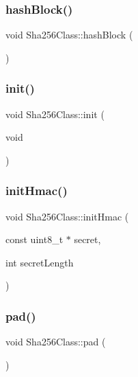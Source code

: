 \subsubsection{\texorpdfstring{hash\+Block()}{hashBlock()}}
{\footnotesize\ttfamily void Sha256\+Class\+::hash\+Block (\begin{DoxyParamCaption}{ }\end{DoxyParamCaption})\hspace{0.3cm}{\ttfamily [private]}}

\mbox{\label{classSha256Class_ac1025d69c51fcd1b882ee41114e58339}} 
\subsubsection{\texorpdfstring{init()}{init()}}
{\footnotesize\ttfamily void Sha256\+Class\+::init (\begin{DoxyParamCaption}\item[{void}]{ }\end{DoxyParamCaption})}

\mbox{\label{classSha256Class_a7f6acc6b6c922cf168a7bde69408734d}} 
\subsubsection{\texorpdfstring{init\+Hmac()}{initHmac()}}
{\footnotesize\ttfamily void Sha256\+Class\+::init\+Hmac (\begin{DoxyParamCaption}\item[{const uint8\+\_\+t $\ast$}]{secret,  }\item[{int}]{secret\+Length }\end{DoxyParamCaption})}

\mbox{\label{classSha256Class_a82049dae520ccf0bd8478f2aef639149}} 
\subsubsection{\texorpdfstring{pad()}{pad()}}
{\footnotesize\ttfamily void Sha256\+Class\+::pad (\begin{DoxyParamCaption}{ }\end{DoxyParamCaption})\hspace{0.3cm}{\ttfamily [private]}}

